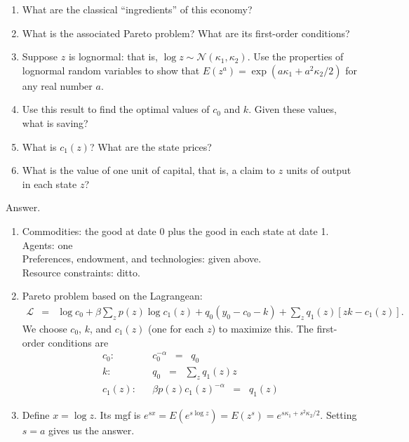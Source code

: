 \documentclass[11pt]{article}
\begin{document}
\begin{enumerate}
\begin{enumerate}
\item What are the classical ``ingredients'' of this economy?
\item What is the associated Pareto problem?
What are its first-order conditions?
\item Suppose $z$ is lognormal:  that is,
$\log z \sim \mathcal{N}(\kappa_1,\kappa_2)$.
Use the properties of lognormal random variables to show
that $E(z^a) = \exp( a \kappa_1 + a^2 \kappa_2/2)$
for any real number $a$.
\item Use this result to find the optimal values of $c_0$ and $k$.
Given these values, what is saving?
\item What is $c_1(z)$?
What are the state prices?
\item What is the value of one unit of capital,
that is, a claim to $z$ units of output in each state $z$?
\end{enumerate}
%
Answer.
\begin{enumerate}
\item Commodities:  the good at date 0 plus the good in each state at date 1. \\
Agents:  one \\
Preferences, endowment, and technologies:  given above. \\
Resource constraints:  ditto.
\item Pareto problem based on the Lagrangean:
\begin{eqnarray*}
    \mathcal{L}  &=&  \log c_0  + \beta \sum_z p(z) \log c_1(z)
          + q_0 (y_0 - c_0 - k)
            + \sum_z q_1(z) [z k - c_1(z)] .
\end{eqnarray*}
We choose $c_0$, $k$, and $c_1(z)$ (one for each $z$) to maximize this.
The first-order conditions are
\begin{eqnarray*}
    c_0: &&  c_0^{-\alpha} \;\;=\;\; q_0 \\
    k:   &&  q_0 \;\;=\;\; \sum_z q_1(z) z \\
    c_1(z): &&  \beta p(z) c_1(z)^{-\alpha} \;\;=\;\; q_1(z)
\end{eqnarray*}

\item Define $x=\log z$.
Its mgf is $e^{sx} = E(e^{s\log z}) = E(z^s) = e^{s\kappa_1 + s^2 \kappa_2/2}$.
Setting $s=a$ gives us the answer.


\end{enumerate}
\end{enumerate}
\end{document}
